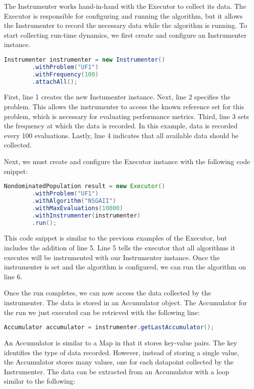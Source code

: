 The Instrumenter works hand-in-hand with the Executor to collect its data.  The Executor is responsible for configuring and running the algorithm, but it allows the Instrumenter to record the necessary data while the algorithm is running.  To start collecting run-time dynamics, we first create and configure an Instrumenter instance.

\begin{lstlisting}[language=Java]
Instrumenter instrumenter = new Instrumenter()
		.withProblem("UF1")
		.withFrequency(100)
		.attachAll();
\end{lstlisting}

First, line 1 creates the new Instumenter instance.  Next, line 2 specifies the problem.  This allows the instrumenter to access the known reference set for this problem, which is necessary for evaluating performance metrics.  Third, line 3 sets the frequency at which the data is recorded.  In this example, data is recorded every 100 evaluations.  Lastly, line 4 indicates that all available data should be collected.

Next, we must create and configure the Executor instance with the following code snippet:

\begin{lstlisting}[language=Java]
NondominatedPopulation result = new Executor()
		.withProblem("UF1")
		.withAlgorithm("NSGAII")
		.withMaxEvaluations(10000)
		.withInstrumenter(instrumenter)
		.run();
\end{lstlisting}

This code snippet is similar to the previous examples of the Executor, but includes the addition of line 5.  Line 5 tells the executor that all algorithms it executes will be instrumented with our Instrumenter instance.  Once the instrumenter is set and the algorithm is configured, we can run the algorithm on line 6.

Once the run completes, we can now access the data collected by the instrumenter.  The data is stored in an Accumulator object.  The Accumulator for the run we just executed can be retrieved with the following line:

\begin{lstlisting}[language=Java]
Accumulator accumulator = instrumenter.getLastAccumulator();
\end{lstlisting}

An Accumulator is similar to a Map in that it stores key-value pairs.  The key identifies the type of data recorded.  However, instead of storing a single value, the Accumulator stores many values, one for each datapoint collected by the Instrumenter.  The data can be extracted from an Accumulator with a loop similar to the following:

